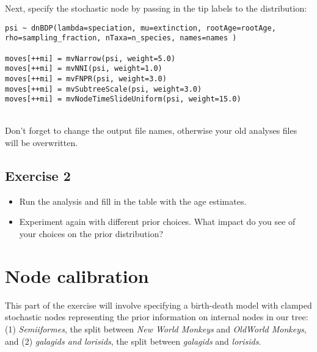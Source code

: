 Next, specify the  stochastic node by passing in the tip labels  to the  distribution:
{\tt \begin{snugshade*}
\begin{lstlisting}
psi ~ dnBDP(lambda=speciation, mu=extinction, rootAge=rootAge, rho=sampling_fraction, nTaxa=n_species, names=names )

moves[++mi] = mvNarrow(psi, weight=5.0)
moves[++mi] = mvNNI(psi, weight=1.0)
moves[++mi] = mvFNPR(psi, weight=3.0)
moves[++mi] = mvSubtreeScale(psi, weight=3.0)
moves[++mi] = mvNodeTimeSlideUniform(psi, weight=15.0)
\end{lstlisting}
\end{snugshade*}}




\noindent \\ \impmark Don't forget to change the output file names, otherwise your old analyses files will be overwritten.

\subsection{Exercise 2}

\begin{itemize}
\item Run the analysis and fill in the table with the age estimates.
\item Experiment again with different prior choices. What impact do you see of your choices on the prior distribution?
\end{itemize}








\newpage
\section{Node calibration}

This part of the exercise will involve specifying a birth-death model with clamped stochastic nodes representing the prior information on internal nodes in our tree: (1) \emph{Semiiformes}, the split between \emph{New World Monkeys} and \emph{OldWorld Monkeys}, and (2) \emph{galagids and lorisids}, the split between \emph{galagids} and \emph{lorisids}.

